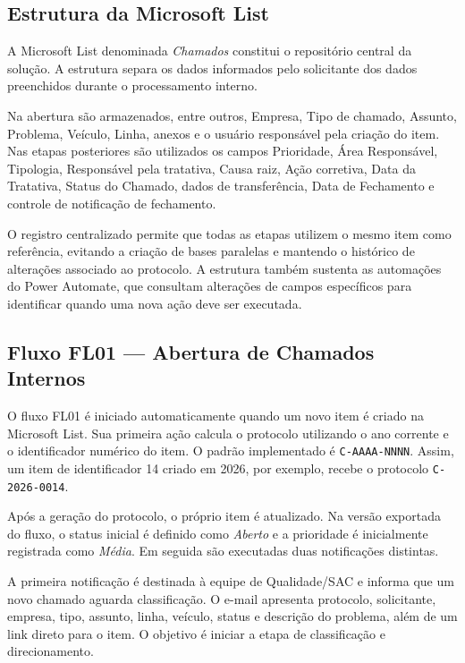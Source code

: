 \subsection{Estrutura da Microsoft List}

A Microsoft List denominada \textit{Chamados} constitui o
repositório central da solução. A estrutura separa os dados
informados pelo solicitante dos dados preenchidos durante o
processamento interno.

Na abertura são armazenados, entre outros, Empresa, Tipo de
chamado, Assunto, Problema, Veículo, Linha, anexos e o
usuário responsável pela criação do item. Nas etapas
posteriores são utilizados os campos Prioridade, Área
Responsável, Tipologia, Responsável pela tratativa, Causa
raiz, Ação corretiva, Data da Tratativa, Status do Chamado,
dados de transferência, Data de Fechamento e controle de
notificação de fechamento.

O registro centralizado permite que todas as etapas
utilizem o mesmo item como referência, evitando a criação
de bases paralelas e mantendo o histórico de alterações
associado ao protocolo. A estrutura também sustenta as
automações do Power Automate, que consultam alterações de
campos específicos para identificar quando uma nova ação
deve ser executada.

\subsection{Fluxo FL01 --- Abertura de Chamados Internos}

O fluxo FL01 é iniciado automaticamente quando um novo item
é criado na Microsoft List. Sua primeira ação calcula o
protocolo utilizando o ano corrente e o identificador
numérico do item. O padrão implementado é
\texttt{C-AAAA-NNNN}. Assim, um item de identificador 14
criado em 2026, por exemplo, recebe o protocolo
\texttt{C-2026-0014}.

Após a geração do protocolo, o próprio item é atualizado.
Na versão exportada do fluxo, o status inicial é definido
como \textit{Aberto} e a prioridade é inicialmente
registrada como \textit{Média}. Em seguida são executadas
duas notificações distintas.

A primeira notificação é destinada à equipe de
Qualidade/SAC e informa que um novo chamado aguarda
classificação. O e-mail apresenta protocolo, solicitante,
empresa, tipo, assunto, linha, veículo, status e descrição
do problema, além de um link direto para o item. O objetivo
é iniciar a etapa de classificação e direcionamento.

